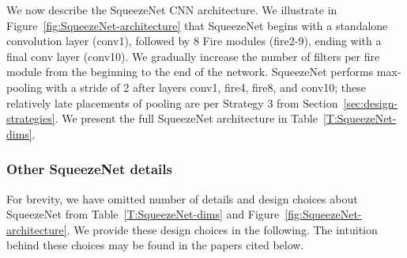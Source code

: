 \documentclass{article} %
\begin{document}
We now describe the SqueezeNet CNN architecture. %
We illustrate in Figure~\ref{fig:SqueezeNet-architecture} that SqueezeNet begins with a standalone convolution layer (conv1), followed by 8 Fire modules (fire2-9), ending with a final conv layer (conv10).
We gradually increase the number of filters per fire module from the beginning to the end of the network.
SqueezeNet performs max-pooling with a stride of 2 after layers conv1, fire4, fire8, and conv10; these relatively late placements of pooling are per Strategy 3 from Section~\ref{sec:design-strategies}.
We present the full SqueezeNet architecture in Table~\ref{T:SqueezeNet-dims}.

\subsubsection{Other SqueezeNet details}
\label{sec:squeezenet-details}
\vspace{-0.1in}

For brevity, we have omitted number of details and design choices about SqueezeNet from Table~\ref{T:SqueezeNet-dims} and Figure~\ref{fig:SqueezeNet-architecture}.
We provide these design choices in the following.
The intuition behind these choices may be found in the papers cited below.
\end{document}
